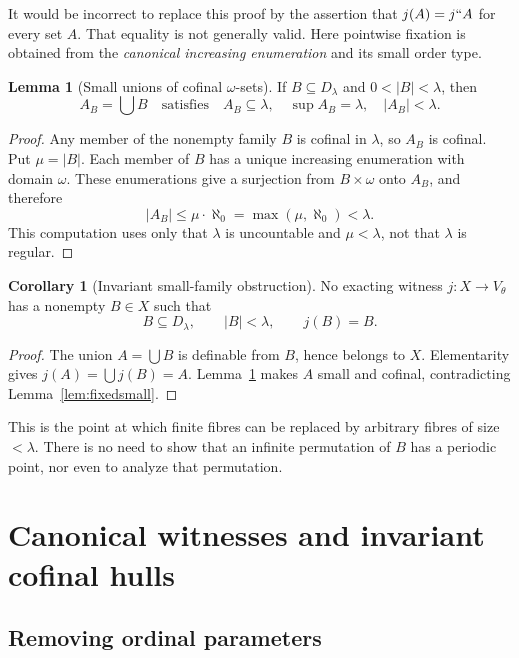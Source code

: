 \documentclass[11pt,letterpaper]{article}
\theoremstyle{definition}
\newtheorem{lemma}[definition]{Lemma}
\newtheorem{corollary}[definition]{Corollary}
\numberwithin{equation}{section}
\begin{document}
It would be incorrect to replace this proof by the assertion that $j(A)=j``A$ for every set $A$. That equality is not generally valid. Here pointwise fixation is obtained from the \emph{canonical increasing enumeration} and its small order type.

\begin{lemma}[Small unions of cofinal $\omega$-sets]\label{lem:union}
If $B\subseteq D_\lambda$ and $0<|B|<\lambda$, then
\[
 A_B=\bigcup B
 \quad\text{satisfies}\quad
 A_B\subseteq\lambda,\quad\sup A_B=\lambda,
 \quad |A_B|<\lambda.
\]
\end{lemma}

\begin{proof}
Any member of the nonempty family $B$ is cofinal in $\lambda$, so $A_B$ is cofinal. Put $\mu=|B|$. Each member of $B$ has a unique increasing enumeration with domain $\omega$. These enumerations give a surjection from $B\times\omega$ onto $A_B$, and therefore
\begin{equation}\label{eq:unionbound}
 |A_B|\le\mu\cdot\aleph_0=\max(\mu,\aleph_0)<\lambda.
\end{equation}
This computation uses only that $\lambda$ is uncountable and $\mu<\lambda$, not that $\lambda$ is regular.
\end{proof}

\begin{corollary}[Invariant small-family obstruction]\label{cor:fixedfamily}
No exacting witness $j:X\to V_\theta$ has a nonempty $B\in X$ such that
\[
 B\subseteq D_\lambda,\qquad |B|<\lambda,
 \qquad j(B)=B.
\]
\end{corollary}

\begin{proof}
The union $A=\bigcup B$ is definable from $B$, hence belongs to $X$. Elementarity gives
$j(A)=\bigcup j(B)=A$. Lemma~\ref{lem:union} makes $A$ small and cofinal, contradicting Lemma~\ref{lem:fixedsmall}.
\end{proof}

This is the point at which finite fibres can be replaced by arbitrary fibres of size $<\lambda$. There is no need to show that an infinite permutation of $B$ has a periodic point, nor even to analyze that permutation.

\section{Canonical witnesses and invariant cofinal hulls}\label{sec:hulls}

\subsection{Removing ordinal parameters}
\end{document}

